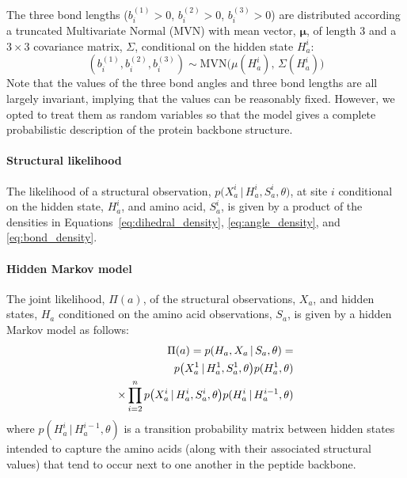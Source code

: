 \documentclass[nogrid]{MBE}%
\begin{document}
The three bond lengths ($b_{i}^{(1)}>0$, $b_{i}^{(2)}>0$, $b_{i}^{(3)}>0$) are 
distributed according a truncated Multivariate Normal (MVN)
with mean vector, $\mathbf{\mu}$, of length 3 and a $3 \times 3$ covariance matrix, $\Sigma$, conditional on the hidden state $H_{a}^{i}$:
\begin{equation}
\label{eq:bond_density}
(b_{i}^{(1)}, b_{i}^{(2)}, b_{i}^{(3)})  \sim \text{MVN}\big(\mu(H_a^{i}),\,\Sigma(H_a^{i})\big)
\end{equation}
Note that the values of the three bond angles and three bond lengths are all largely invariant, implying that the values can be reasonably fixed. However, we opted to treat them as random variables so that the model gives a complete probabilistic description of the protein backbone structure.

\paragraph{Structural likelihood}
The likelihood of a structural observation, $p\big(X_{a}^{i}\,|\,H_{a}^{i},S_{a}^{i},\theta\big)$, at site $i$ conditional on the hidden state, $H^{i}_a$, and amino acid, $S^{i}_a$, is given by a product of the densities in Equations~\ref{eq:dihedral_density}, \ref{eq:angle_density}, and \ref{eq:bond_density}.

\paragraph{Hidden Markov model}
The joint likelihood, $\Pi(a)$, of the structural observations, $X_a$, and hidden states, $H_a$  conditioned on the amino acid observations, $S_a$, is given by a hidden Markov model as follows:
\begin{align}
\label{eq:proteinlikelihood}
\Pi(a) = p(H_{a},X_{a}\,|\,S_{a},\theta) = \notag \\
 p\big(X_{a}^{1}\,|\,H_{a}^{1},S_{a}^{1},\theta\big)p(H_{a}^{1},\theta)\notag \\
\times \prod_{i=2}^n p\big(X_{a}^{i}\,|\,H_{a}^{i},S_{a}^{i},\theta\big)p(H_{a}^{i}\,|\,H_{a}^{i-1},\theta) 
\end{align}
where $p(H_{a}^{i}\,|\,H_{a}^{i-1},\theta)$ is a transition probability matrix between hidden states intended to capture the amino acids (along with their associated structural values) that tend to occur next to one another in the peptide backbone.
\end{document}

